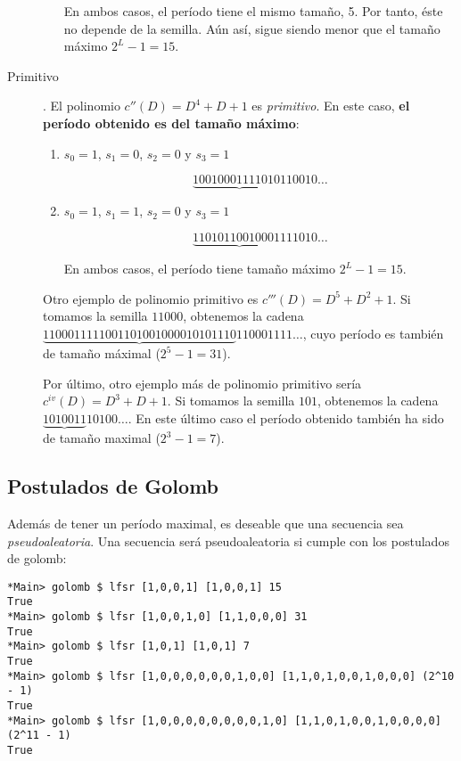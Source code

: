 \documentclass[10pt,spanish]{article}
\begin{document}
\begin{description}
\begin{enumerate}
        En ambos casos, el período tiene el mismo tamaño, 5. Por tanto, éste no depende de la semilla. Aún así, sigue siendo menor que el tamaño máximo $2^L - 1 = 15$.
    \end{enumerate}

    \item[Primitivo]. El polinomio $c''(D) = D^4 + D + 1$ es \textit{\textcolor{azul}{primitivo}}. En este caso, \textbf{\textcolor{azul}{el período obtenido es del tamaño máximo}}:

    \begin{enumerate}
        \item $s_0 = 1$, $s_1 = 0$, $s_2 = 0$ y $s_3 = 1$

        \begin{displaymath}
            \underbrace{100100011110101}10010\ldots
        \end{displaymath}

        \item $s_0 = 1$, $s_1 = 1$, $s_2 = 0$ y $s_3 = 1$

        \begin{displaymath}
            \underbrace{110101100100011}11010\ldots
        \end{displaymath}

        En ambos casos, el período tiene tamaño máximo $2^L - 1 = 15$.
    \end{enumerate}

    Otro ejemplo de polinomio primitivo es $c'''(D) = D^5 + D^2 + 1$. Si tomamos la semilla $11000$, obtenemos la cadena $\underbrace{1100011111001101001000010101110}110001111\ldots$, cuyo período es también de tamaño máximal ($2^5 - 1 = 31$).

    Por último, otro ejemplo más de polinomio primitivo sería $c^{iv}(D) = D^3 + D + 1$. Si tomamos la semilla $101$, obtenemos la cadena $\underbrace{1010011}10100\ldots$. En este último caso el período obtenido también ha sido de tamaño maximal ($2^3 - 1 = 7$).
\end{description}

\subsection{\textcolor{azul}Postulados de Golomb}
Además de tener un período maximal, es deseable que una secuencia sea \textit{\textcolor{azul}{pseudoaleatoria}}. Una secuencia será pseudoaleatoria si cumple con los postulados de golomb:

\begin{verbatim}
*Main> golomb $ lfsr [1,0,0,1] [1,0,0,1] 15
True
*Main> golomb $ lfsr [1,0,0,1,0] [1,1,0,0,0] 31
True
*Main> golomb $ lfsr [1,0,1] [1,0,1] 7
True
*Main> golomb $ lfsr [1,0,0,0,0,0,0,1,0,0] [1,1,0,1,0,0,1,0,0,0] (2^10 - 1)
True
*Main> golomb $ lfsr [1,0,0,0,0,0,0,0,0,1,0] [1,1,0,1,0,0,1,0,0,0,0] (2^11 - 1)
True
\end{verbatim}
\end{document}
